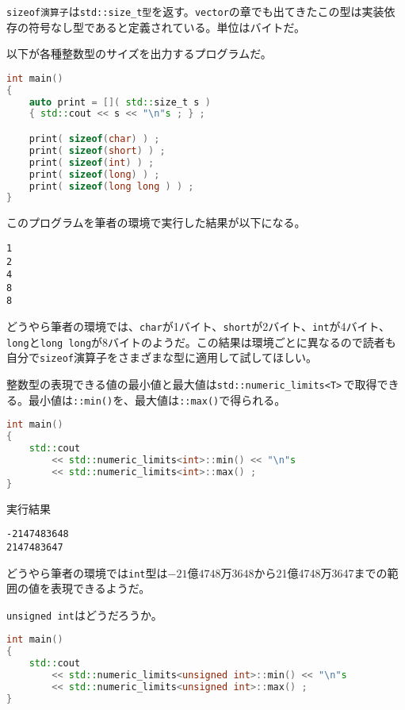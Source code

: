 \texttt{sizeof演算子}は\texttt{std::size\_t型}を返す。\texttt{vector}の章でも出てきたこの型は実装依存の符号なし型であると定義されている。単位はバイトだ。

以下が各種整数型のサイズを出力するプログラムだ。

\begin{lstlisting}[language={C++}]
int main()
{
    auto print = []( std::size_t s )
    { std::cout << s << "\n"s ; } ;

    print( sizeof(char) ) ;
    print( sizeof(short) ) ;
    print( sizeof(int) ) ;
    print( sizeof(long) ) ;
    print( sizeof(long long ) ) ;
}
\end{lstlisting}

このプログラムを筆者の環境で実行した結果が以下になる。

\begin{lstlisting}[style=terminal]
1
2
4
8
8
\end{lstlisting}

どうやら筆者の環境では、\texttt{char}が1バイト、\texttt{short}が2バイト、\texttt{int}が4バイト、\texttt{long}と\texttt{long long}が8バイトのようだ。この結果は環境ごとに異なるので読者も自分で\texttt{sizeof}演算子をさまざまな型に適用して試してほしい。


整数型の表現できる値の最小値と最大値は\texttt{std::numeric\_limits<T>}\,で取得できる。最小値は\texttt{::min()}を、最大値は\texttt{::max()}で得られる。

\begin{lstlisting}[language={C++}]
int main()
{
    std::cout
        << std::numeric_limits<int>::min() << "\n"s
        << std::numeric_limits<int>::max() ;
}
\end{lstlisting}

実行結果

\begin{lstlisting}[style=terminal]
-2147483648
2147483647
\end{lstlisting}

どうやら筆者の環境では\texttt{int}型は\(−21億4748万3648\)から21億4748万3647までの範囲の値を表現できるようだ。

\texttt{unsigned int}はどうだろうか。

\begin{lstlisting}[language={C++}]
int main()
{
    std::cout
        << std::numeric_limits<unsigned int>::min() << "\n"s
        << std::numeric_limits<unsigned int>::max() ;
}
\end{lstlisting}

